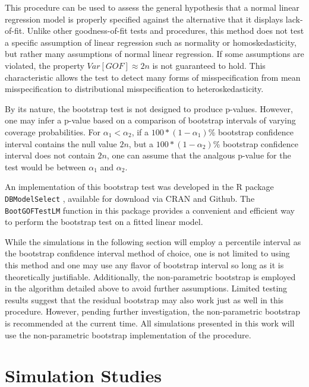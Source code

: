 \documentclass[sn-mathphys-ay]{sn-jnl}
\begin{document}
		This procedure can be used to assess the general hypothesis that a normal linear regression model is properly specified against the alternative that it displays lack-of-fit.
		Unlike other goodness-of-fit tests and procedures, this method does not test a specific assumption of linear regression such as normality or homoskedasticity, but rather
		many assumptions of normal linear regression. If some assumptions are violated, the property $Var[GOF] \approx 2n$ is not guaranteed to hold. This characteristic allows the test to detect
		many forms of misspecification from mean misspecification to distributional misspecification to heteroskedasticity. 

		By its nature, the bootstrap test is not designed to produce p-values. However, one may infer a p-value based on a comparison of bootstrap intervals of varying coverage probabilities. For $\alpha_1 < \alpha_2$, if a 
		$100*(1-\alpha_1)$\% bootstrap confidence interval contains the null value $2n$, but a $100*(1-\alpha_2)$\% bootstrap confidence interval does not contain $2n$, one can assume that 
		the analgous p-value for the test would be between $\alpha_1$ and $\alpha_2$.

		An implementation of this bootstrap test was developed in the R package \texttt{DBModelSelect} \citep{Koeneman}, available for download via CRAN and Github.
		The \texttt{BootGOFTestLM} function in this package provides a convenient and efficient way to perform the bootstrap test on a fitted linear model.
		
		While the simulations in the following section will employ a percentile interval as the bootstrap confidence interval method of choice, one is not limited to using this method
		and one may use any flavor of bootstrap interval so long as it is theoretically justifiable. Additionally, the non-parametric bootstrap is employed in the algorithm detailed above to avoid further
		assumptions. Limited testing results suggest that the residual bootstrap may also work just as well in this procedure. However, pending further investigation, the non-parametric
		bootstrap is recommended at the current time. All simulations presented in this work will use the non-parametric bootstrap implementation of the procedure.

\section{Simulation Studies}
\end{document}
